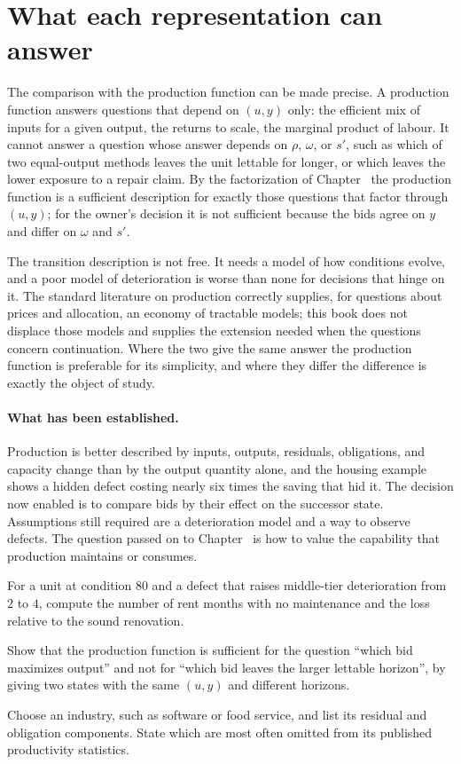 \section{What each representation can answer}

The comparison with the production function can be made precise. A production function answers questions that depend on $(u,y)$ only: the efficient mix of inputs for a given output, the returns to scale, the marginal product of labour. It cannot answer a question whose answer depends on $\rho$, $\omega$, or $s'$, such as which of two equal-output methods leaves the unit lettable for longer, or which leaves the lower exposure to a repair claim. By the factorization of Chapter~ the production function is a sufficient description for exactly those questions that factor through $(u,y)$; for the owner's decision it is not sufficient because the bids agree on $y$ and differ on $\omega$ and $s'$.

The transition description is not free. It needs a model of how conditions evolve, and a poor model of deterioration is worse than none for decisions that hinge on it. The standard literature on production correctly supplies, for questions about prices and allocation, an economy of tractable models; this book does not displace those models and supplies the extension needed when the questions concern continuation. Where the two give the same answer the production function is preferable for its simplicity, and where they differ the difference is exactly the object of study.

\paragraph{What has been established.} Production is better described by inputs, outputs, residuals, obligations, and capacity change than by the output quantity alone, and the housing example shows a hidden defect costing nearly six times the saving that hid it. The decision now enabled is to compare bids by their effect on the successor state. Assumptions still required are a deterioration model and a way to observe defects. The question passed on to Chapter~ is how to value the capability that production maintains or consumes.

\begin{exercise}
For a unit at condition $80$ and a defect that raises middle-tier deterioration from $2$ to $4$, compute the number of rent months with no maintenance and the loss relative to the sound renovation.
\end{exercise}
\begin{exercise}
Show that the production function is sufficient for the question ``which bid maximizes output'' and not for ``which bid leaves the larger lettable horizon'', by giving two states with the same $(u,y)$ and different horizons.
\end{exercise}
\begin{exercise}
Choose an industry, such as software or food service, and list its residual and obligation components. State which are most often omitted from its published productivity statistics.
\end{exercise}

